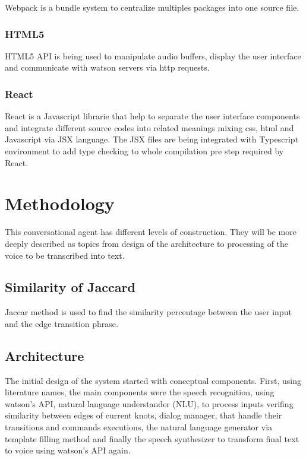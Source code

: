 \documentclass[
	article,			%
	11pt,				%
	oneside,			%
	a4paper,			%
	english,			%
	english,				%
	]{abntex2}
\begin{document}
Webpack is a bundle system to centralize multiples packages into one source file.

\subsubsection{HTML5}

HTML5 API is being used to manipulate audio buffers, display the user interface and communicate
with watson servers via http requests.

\subsubsection{React}

React is a Javascript librarie that help to separate the user interface components and integrate
different source codes into related meanings mixing css, html and Javascript via JSX language.
The JSX files are being integrated with Typescript environment to add type checking to whole
compilation pre step required by React.

\section{Methodology}

This conversational agent has different levels of construction. They will be more deeply described 
as topics from design of the architecture to processing of the voice to be transcribed into text.


\subsection{Similarity of Jaccard}

Jaccar method is used to find the similarity percentage between the user input and the edge transition
phrase.

\subsection{Architecture}

The initial design of the system started with conceptual components. First, using literature names,
the main components were the speech recognition, using watson's API, natural language understander (NLU),
to process inputs verifing similarity between edges of current knots, dialog manager, that handle
their transitions and commands executions, the natural language generator via template filling
method and finally the speech synthesizer to transform final text to voice using watson's API again.   
\end{document}
